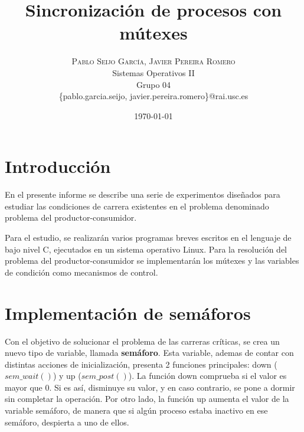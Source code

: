 \documentclass[a4paper,twocolumn]{article}
\title{Sincronización de procesos con mútexes} %
\author{%
	\textsc{Pablo Seijo García, Javier Pereira Romero} \\[1ex] %
	\normalsize Sistemas Operativos II\\
	\normalsize Grupo 04 \\ %
	\normalsize \{pablo.garcia.seijo, javier.pereira.romero\}@rai.usc.es %
}
\date{\today} %
\begin{document}
	
	\maketitle
	
	
	\section{Introducción}

        En el presente informe se describe una serie de experimentos diseñados para estudiar las condiciones de carrera existentes en el problema denominado problema del productor-consumidor.
        
        Para el estudio, se realizarán varios programas breves escritos en el lenguaje de bajo nivel C, ejecutados en un sistema operativo Linux. Para la resolución del problema del productor-consumidor se implementarán los mútexes y las variables de condición como mecanismos de control.

 
	
	

	

 	\section{Implementación de semáforos}

    Con el objetivo de solucionar el problema de las carreras críticas, se crea un nuevo tipo de variable, llamada \textbf{semáforo}. Esta variable, ademas de contar con distintas acciones de inicialización, presenta 2 funciones principales: down ($sem\_wait()$) y up ($sem\_post()$). La función down comprueba si el valor es mayor que 0. Si es así, disminuye su valor, y en caso contrario, se pone a dormir sin completar la operación. Por otro lado, la función up aumenta el valor de la variable semáforo, de manera que si algún proceso estaba inactivo en ese semáforo, despierta a uno de ellos.
    
\end{document}
